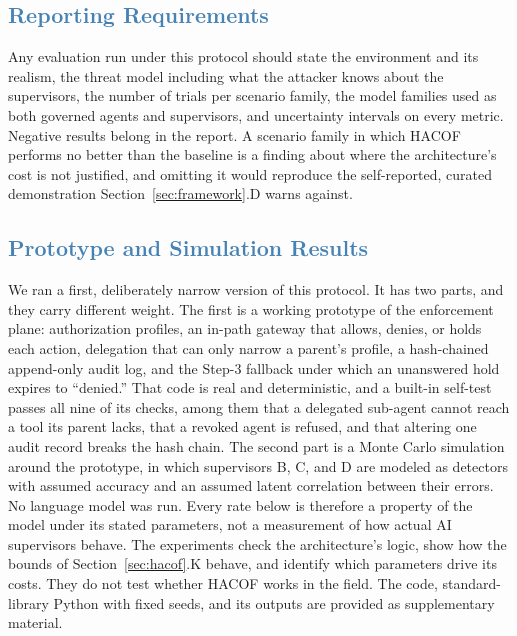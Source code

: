 \documentclass[journal]{IEEEtran}
\newcommand{\hacof}{HACOF}
\begin{document}
\subsection{\textcolor{steelblue}{Reporting Requirements}}

Any evaluation run under this protocol should state the environment and its realism, the threat model including what the attacker knows about the supervisors, the number of trials per scenario family, the model families used as both governed agents and supervisors, and uncertainty intervals on every metric. Negative results belong in the report. A scenario family in which \hacof{} performs no better than the baseline is a finding about where the architecture's cost is not justified, and omitting it would reproduce the self-reported, curated demonstration Section~\ref{sec:framework}.D warns against.

\subsection{\textcolor{steelblue}{Prototype and Simulation Results}}
\label{sec:eval-results}

We ran a first, deliberately narrow version of this protocol. It has two parts, and they carry different weight. The first is a working prototype of the enforcement plane: authorization profiles, an in-path gateway that allows, denies, or holds each action, delegation that can only narrow a parent's profile, a hash-chained append-only audit log, and the Step-3 fallback under which an unanswered hold expires to ``denied.'' That code is real and deterministic, and a built-in self-test passes all nine of its checks, among them that a delegated sub-agent cannot reach a tool its parent lacks, that a revoked agent is refused, and that altering one audit record breaks the hash chain. The second part is a Monte Carlo simulation around the prototype, in which supervisors B, C, and D are modeled as detectors with assumed accuracy and an assumed latent correlation between their errors. No language model was run. Every rate below is therefore a property of the model under its stated parameters, not a measurement of how actual AI supervisors behave. The experiments check the architecture's logic, show how the bounds of Section~\ref{sec:hacof}.K behave, and identify which parameters drive its costs. They do not test whether \hacof{} works in the field. The code, standard-library Python with fixed seeds, and its outputs are provided as supplementary material.
\end{document}
